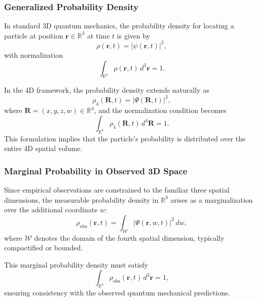 \documentclass[12pt]{article}
\begin{document}
\subsubsection*{Generalized Probability Density}

In standard 3D quantum mechanics, the probability density for locating a particle at position \(\mathbf{r} \in \mathbb{R}^3\) at time \(t\) is given by
\begin{equation}
    \rho(\mathbf{r}, t) = |\psi(\mathbf{r}, t)|^2,
\end{equation}
with normalization
\begin{equation}
    \int_{\mathbb{R}^3} \rho(\mathbf{r}, t) \, d^3 \mathbf{r} = 1.
\end{equation}

In the 4D framework, the probability density extends naturally as
\begin{equation}
    \rho_4(\mathbf{R}, t) = |\Psi(\mathbf{R}, t)|^2,
\end{equation}
where \(\mathbf{R} = (x, y, z, w) \in \mathbb{R}^4\), and the normalization condition becomes
\begin{equation}
    \int_{\mathbb{R}^4} \rho_4(\mathbf{R}, t) \, d^4 \mathbf{R} = 1.
\end{equation}
This formulation implies that the particle's probability is distributed over the entire 4D spatial volume.

\subsubsection*{Marginal Probability in Observed 3D Space}

Since empirical observations are constrained to the familiar three spatial dimensions, the measurable probability density in \(\mathbb{R}^3\) arises as a marginalization over the additional coordinate \(w\):
\begin{equation}
    \rho_{\text{obs}}(\mathbf{r}, t) = \int_{\mathcal{W}} |\Psi(\mathbf{r}, w, t)|^2 \, dw,
\end{equation}
where \(\mathcal{W}\) denotes the domain of the fourth spatial dimension, typically compactified or bounded.

This marginal probability density must satisfy
\begin{equation}
    \int_{\mathbb{R}^3} \rho_{\text{obs}}(\mathbf{r}, t) \, d^3 \mathbf{r} = 1,
\end{equation}
ensuring consistency with the observed quantum mechanical predictions.
\end{document}
